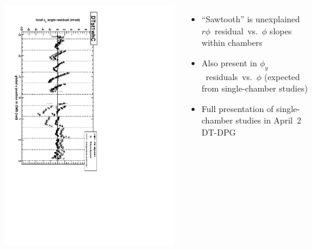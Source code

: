 \documentclass[compress]{beamer}
\begin{document}
\begin{frame}
\begin{columns}
\includegraphics[height=\linewidth, angle=90]{sawtooth_also_in_phiy.pdf}

\begin{itemize}\setlength{\itemsep}{0.25 cm}
\item ``Sawtooth'' is unexplained \mbox{$r\phi$ residual vs.\ $\phi$} slopes within chambers
\item Also present in \mbox{$\phi_y$ residuals vs.\ $\phi$} (expected from single-chamber studies)
\item Full presentation of single-chamber studies in April~2 DT-DPG
\end{itemize}
\end{columns}
\end{frame}
\end{document}
